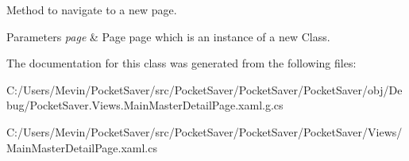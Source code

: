 Method to navigate to a new page. 


\begin{DoxyParams}{Parameters}
{\em page} & Page page which is an instance of a new Class.\\
\hline
\end{DoxyParams}


The documentation for this class was generated from the following files\+:\begin{DoxyCompactItemize}
\item 
C\+:/\+Users/\+Mevin/\+Pocket\+Saver/src/\+Pocket\+Saver/\+Pocket\+Saver/\+Pocket\+Saver/obj/\+Debug/Pocket\+Saver.\+Views.\+Main\+Master\+Detail\+Page.\+xaml.\+g.\+cs\item 
C\+:/\+Users/\+Mevin/\+Pocket\+Saver/src/\+Pocket\+Saver/\+Pocket\+Saver/\+Pocket\+Saver/\+Views/Main\+Master\+Detail\+Page.\+xaml.\+cs\end{DoxyCompactItemize}

